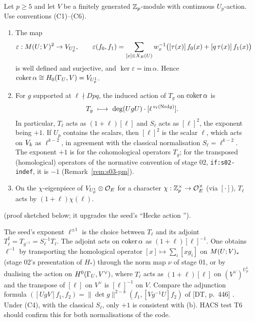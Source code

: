 \begin{theorem}\label{thm:s03-iharaH0}
Let $p\ge5$ and let $V$ be a finitely generated $\mathbb{Z}_p$-module with continuous $U_p$-action. Use conventions (C1)--(C6).
\begin{enumerate}[label=(\alph*)]
\item The map
  \[\varepsilon:M(U;V)^2\to V_{U^1_p},\qquad \varepsilon(f_0,f_1)=\sum_{[x]\in X_B(U)}w_x^{-1}\big([\tau(x)]\,f_0(x)+[q\,\tau(x)]\,f_1(x)\big)\]
  is well defined and surjective, and $\ker\varepsilon=\mathrm{im}\,\alpha$. Hence $\operatorname{coker}\alpha\cong H_0(\Gamma_U,V)=V_{U^1_p}$.
\item For $g$ supported at $\ell\nmid Dpq$, the induced action of $T_g$ on $\operatorname{coker}\alpha$ is
  \[T_g\ \longmapsto\ \deg(UgU)\cdot[\ell^{\,v_\ell(\Nrd g)}].\]
  In particular, $T_\ell$ acts as $(1+\ell)[\ell]$ and $S_\ell$ acts as $[\ell]^2$, the exponent being $+1$. If $U_p$ contains
  the scalars, then $[\ell]^2$ is the scalar $\ell$, which acts on $V_k$ as $\ell^{k-2}$, in agreement with the classical
  normalisation $S_\ell=\ell^{k-2}$. The exponent $+1$ is for the cohomological operators $T_g$; for the transposed (homological) operators of the normative convention of stage 02, \texttt{if:s02-indef}, it is $-1$ (Remark~\ref{rem:s03-pm}).
\item On the $\chi$-eigenpiece of $V_{U^1_p}\otimes\mathcal{O}_E$ for a character $\chi:\mathbb{Z}_p^\times\to\mathcal{O}_E^\times$ (via $[\cdot]$), $T_\ell$ acts by
  $(1+\ell)\chi(\ell)$.
\end{enumerate}
\sttoprove{} (proof sketched below; it upgrades the seed's ``Hecke action \stsketch'').
\end{theorem}

\begin{remark}\label{rem:s03-pm}
The seed's exponent $\ell^{\pm1}$ is the choice between $T_\ell$ and its adjoint $T_\ell^\dagger=T_{g^{-1}}=S_\ell^{-1}T_\ell$. The
adjoint acts on $\operatorname{coker}\alpha$ as $(1+\ell)[\ell]^{-1}$. One obtains $\ell^{-1}$ by transporting the homological operator
$[x]\mapsto\sum_i[xg_i]$ on $M(U;V)_*$ (stage 02's presentation of $H_*$) through the norm map $\nu$ of stage 01, or by dualising the action on $H^0(\Gamma_U,V^\vee)$, where $T_\ell$ acts as
$(1+\ell)[\ell]$ on $(V^\vee)^{U^1_p}$ and the transpose of $[\ell]$ on $V^\vee$ is $[\ell]^{-1}$ on $V$. Compare the adjunction
formula $([UgV]f_1,f_2)=\|\det g\|^{2-k}(f_1,[Vg^{-1}U]f_2)$ of [DT, p.~446]
. Under (C4), with the classical $S_\ell$,
only $+1$ is consistent with (b). HACS test T6 should confirm this for both normalisations of the code.
\end{remark}

